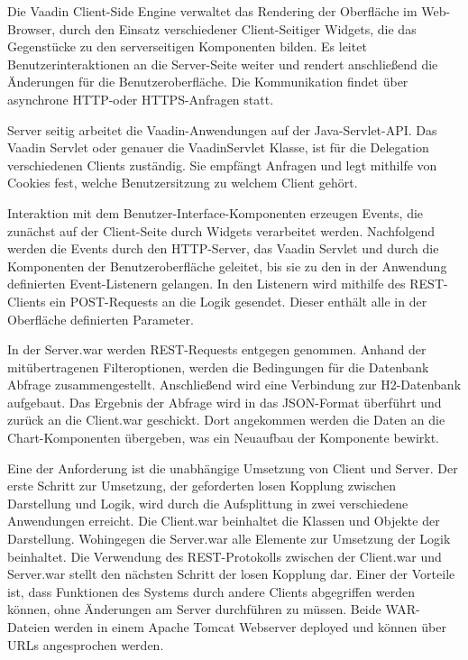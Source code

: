 Die Vaadin Client-Side Engine verwaltet das Rendering der Oberfläche im Web-Browser, durch den Einsatz verschiedener Client-Seitiger Widgets, die das Gegenstücke zu den serverseitigen Komponenten bilden. Es leitet Benutzerinteraktionen an die Server-Seite weiter und rendert anschließend die Änderungen für die Benutzeroberfläche. Die Kommunikation findet über asynchrone HTTP-oder HTTPS-Anfragen statt.

Server seitig arbeitet die Vaadin-Anwendungen auf der Java-Servlet-API. Das Vaadin Servlet oder genauer die VaadinServlet Klasse, ist für die Delegation verschiedenen Clients zuständig. Sie empfängt Anfragen und legt mithilfe von Cookies fest, welche Benutzersitzung zu welchem Client gehört.

Interaktion mit dem Benutzer-Interface-Komponenten erzeugen Events, die zunächst auf der Client-Seite durch Widgets verarbeitet werden. Nachfolgend werden die Events durch den HTTP-Server, das Vaadin Servlet und durch die Komponenten der Benutzeroberfläche geleitet, bis sie zu den in der Anwendung definierten Event-Listenern gelangen. In den Listenern wird mithilfe des REST-Clients ein POST-Requests an die Logik gesendet. Dieser enthält alle in der Oberfläche definierten Parameter. 

In der Server.war werden REST-Requests entgegen genommen. Anhand der mitübertragenen Filteroptionen, werden die Bedingungen für die Datenbank Abfrage zusammengestellt. Anschließend wird eine Verbindung zur H2-Datenbank aufgebaut. Das Ergebnis der Abfrage wird in das JSON-Format überführt und zurück an die Client.war geschickt. Dort angekommen werden die Daten an die Chart-Komponenten übergeben, was ein Neuaufbau der Komponente bewirkt.      

Eine der Anforderung ist die unabhängige Umsetzung von Client und Server. Der erste Schritt zur Umsetzung, der geforderten losen Kopplung zwischen Darstellung und Logik, wird durch die Aufsplittung in zwei verschiedene Anwendungen erreicht. Die Client.war beinhaltet die Klassen und Objekte der Darstellung. Wohingegen die Server.war alle Elemente zur Umsetzung der Logik beinhaltet. Die Verwendung des REST-Protokolls zwischen der Client.war und Server.war stellt den nächsten Schritt der losen Kopplung dar. Einer der Vorteile ist, dass Funktionen des Systems durch andere Clients abgegriffen werden können, ohne Änderungen am Server durchführen zu müssen. Beide WAR-Dateien werden in einem Apache Tomcat Webserver deployed und können über URLs angesprochen werden.

